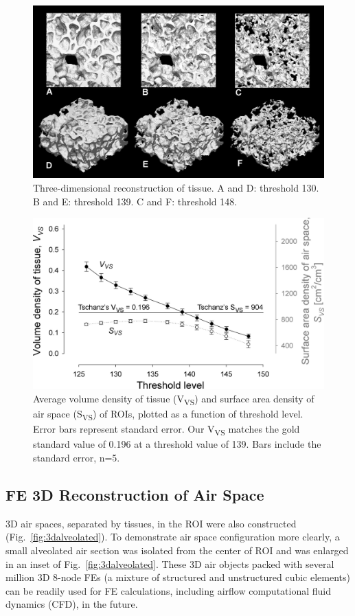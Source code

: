\begin{figure}[htb]
	\centering
	\includegraphics[width=\imsize]{img/Tsuda2008/Tsuda-07}
	\caption[Three-dimensional reconstruction of tissue]{Three-dimensional reconstruction of tissue. A and D: threshold 130. B and E: threshold 139. C and F: threshold 148.}
	\label{fig:3dreconstruction}
\end{figure}

\begin{figure}[htb]
	\centering
	\includegraphics[width=\imsize]{img/Tsuda2008/Tsuda-08}
	\caption[Average volume density of tissue and surface area density of air space]{Average volume density of tissue (V\textsubscript{VS}) and surface area density of air space (S\textsubscript{VS}) of ROIs, plotted as a function of threshold level. Error bars represent standard error. Our V\textsubscript{VS} matches the gold standard value of 0.196 at a threshold value of 139. Bars include the standard error, n=5.}
	\label{fig:VVSplot}
\end{figure}

\subsection{FE 3D Reconstruction of Air Space}
3D air spaces, separated by tissues, in the ROI were also constructed (Fig.~\ref{fig:3dalveolated}). To demonstrate air space configuration more clearly, a small alveolated air section was isolated from the center of ROI and was enlarged in an inset of Fig.~\ref{fig:3dalveolated}. These 3D air objects packed with several million 3D 8-node FEs (a mixture of structured and unstructured cubic elements) can be readily used for FE calculations, including airflow computational fluid dynamics (CFD), in the future.

